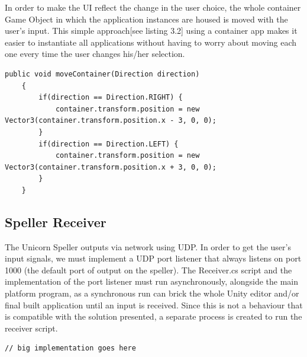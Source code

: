 In order to make the UI reflect the change in the user choice, the whole container Game Object in which the application instances are housed is moved with the user's input. This simple approach[see listing 3.2] using a container app makes it easier to instantiate all applications without having to worry about moving each one every time the user changes his/her selection.

\begin{lstlisting}[language={[Sharp]C}, caption={Manager.cs initialisation}, label={Script}]
    public void moveContainer(Direction direction)
    {
        if(direction == Direction.RIGHT) {
            container.transform.position = new Vector3(container.transform.position.x - 3, 0, 0);
        }
        if(direction == Direction.LEFT) {
            container.transform.position = new Vector3(container.transform.position.x + 3, 0, 0);
        }
    }
\end{lstlisting}


\subsection{Speller Receiver}
The Unicorn Speller outputs via network using UDP. In order to get the user's input signals, we must implement a UDP port listener that always listens on port 1000 (the default port of output on the speller). The Receiver.cs script and the implementation of the port listener must run asynchronously, alongside the main platform program, as a synchronous run can brick the whole Unity editor and/or final built application until an input is received. Since this is not a behaviour that is compatible with the solution presented, a separate process is created to run the receiver script.
\begin{lstlisting}[language={[Sharp]C}, caption={Manager.cs initialisation}, label={Script}]
    // big implementation goes here
\end{lstlisting}


